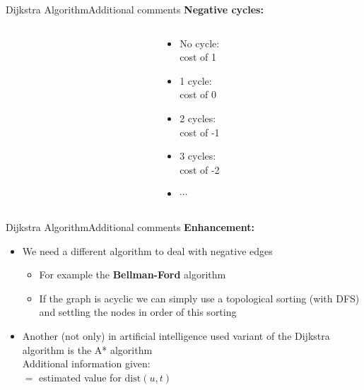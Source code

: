 \begin{frame}{Dijkstra Algorithm}{Additional comments}
  \textbf{Negative cycles:}
  \begin{columns}[c]
    \begin{column}{0.7\linewidth}
      \begin{adjustbox}{width=\linewidth}
        \def\DijkstraNegativeCycle{1}%
        
      \end{adjustbox}
    \end{column}
    \begin{column}{0.3\linewidth}
      \begin{itemize}
        \item
          No cycle:\\
          {\color{MainA}cost of 1}
        \item
          1 cycle:\\
          {\color{MainA}cost of 0}
        \item
          2 cycles:\\
          {\color{MainA}cost of -1}
        \item
          3 cycles:\\
          {\color{MainA}cost of -2}
        \item
          $\cdots$
      \end{itemize}
    \end{column}
  \end{columns}
\end{frame}


\begin{frame}{Dijkstra Algorithm}{Additional comments}
  \textbf{Enhancement:}
  \begin{itemize}
    \item
      We need a different algorithm to deal with negative edges
      \begin{itemize}
        \item
          For example the \textbf{Bellman-Ford} algorithm
        \item
          If the graph is {\color{MainA}acyclic} we can simply use a
          topological sorting (with DFS) and settling the nodes in order
          of this sorting
      \end{itemize}
    \item
      Another (not only) in artificial intelligence used variant of the Dijkstra
      algorithm is the {\color{MainA}A* algorithm}\\
      Additional information given:\\
      $=$ estimated value for {\color{MainA}$\mathrm{dist}(u, t)$}
  \end{itemize}
\end{frame}

